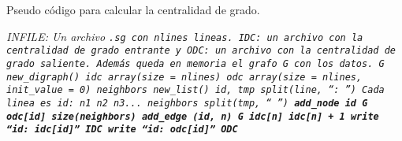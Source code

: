 \begin{algorithm}
  \caption{Pseudo código para calcular la centralidad de grado.}\label{alg:degree}
  \begin{algorithmic}[1]
    \Require \it{INFILE}: Un archivo \tt{.sg} con \it{nlines} lineas.
    \Ensure \it{IDC}: un archivo con la centralidad de grado entrante y
            \it{ODC}: un archivo con la centralidad de grado saliente.
            Además queda en memoria el grafo \it{G} con los datos.
		\State \it{G} \get \it{new\_digraph}()
    \State \it{idc} \get \it{array}(\it{size = nlines})
    \State \it{odc} \get \it{array}(\it{size = nlines, init\_value = 0})
      \State \it{neighbors} \get \it{new\_list}()
      \State \it{id, tmp} \get \it{split}(\it{line, ``: ''})
      \Comment Cada linea es \tt{id: n1 n2 n3...}
      \State \it{neighbors} \get  \it{split}(\it{tmp, `` ''})
      \State \bf{add\_node} \it{id} \ra \it{G}
      \State \it{odc}[\it{id}] \get \it{size}(\it{neighbors})
        \State \bf{add\_edge} \it{(id, n)} \ra \it{G}
        \State \it{idc}[\it{n}] \get \it{idc}[\it{n}] + 1
      \EndFor
    \EndFor
      \State \bf{write} ``\it{id}: \it{idc}[\it{id}]'' \ra \it{IDC}
      \State \bf{write} ``\it{id}: \it{odc}[\it{id}]'' \ra \it{ODC}
    \EndFor
  \end{algorithmic}
\end{algorithm}
